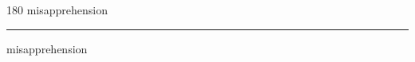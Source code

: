 
\begin{frame}
\begin{center}
\begin{turn}{180}
{\fontsize{2.5cm}{1em}\selectfont misapprehension}
\end{turn}
\vspace{1em}\par  
\hrule
\vspace{1em}\par  
{\fontsize{2.5cm}{1em}\selectfont misapprehension}
\end{center}
\end{frame}

